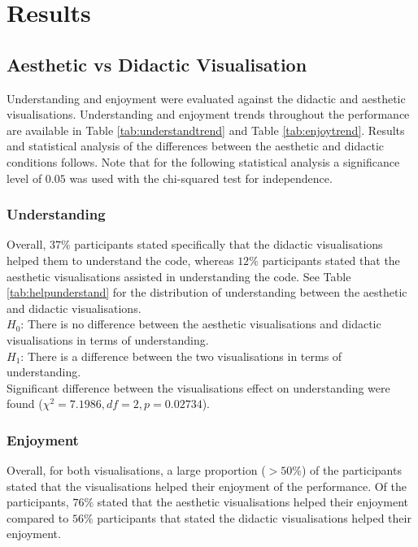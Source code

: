 \documentclass{article}
\begin{document}
\section{Results}

\subsection{Aesthetic vs Didactic Visualisation}

Understanding and enjoyment were evaluated against the didactic and aesthetic visualisations. Understanding and enjoyment trends throughout the performance are available in Table \ref{tab:understandtrend} and Table \ref{tab:enjoytrend}. Results and statistical analysis of the differences between the aesthetic and didactic conditions follows. Note that for the following statistical analysis a significance level of $0.05$ was used with the chi-squared test for independence.\\

\subsubsection{Understanding}
Overall, $37\%$ participants stated specifically that the didactic visualisations helped them to understand the code, whereas $12\%$ participants stated that the aesthetic visualisations assisted in understanding the code. See Table \ref{tab:helpunderstand} for the distribution of understanding between the aesthetic and didactic visualisations.\\

$H_0$: There is no difference between the aesthetic visualisations and didactic visualisations in terms of understanding.\\
$H_1$: There is a difference between the two visualisations in terms of understanding.\\

Significant difference between the visualisations effect on understanding were found ($\chi^2=7.1986,df=2,p=0.02734$).

\subsubsection{Enjoyment}
Overall, for both visualisations, a large proportion ($> 50\%$) of the participants stated that the visualisations helped their enjoyment of the performance. Of the participants, $76\%$ stated that the aesthetic visualisations helped their enjoyment compared to $56\%$ participants that stated the didactic visualisations helped their enjoyment.\\
\end{document}
